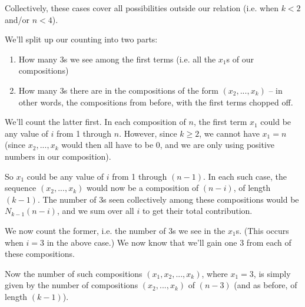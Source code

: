 Collectively, these cases cover all possibilities outside our relation (i.e. when $k < 2$ and/or $n < 4$). 


We'll split up our counting into two parts:
\begin{enumerate}
\item How many 3s we see among the first terms (i.e. all the $x_1$s of our compositions)
\item How many 3s there are in the compositions of the form $(x_2, ..., x_k)$ -- in other words, the compositions from before, with the first terms chopped off.
\end{enumerate}






We'll count the latter first. In each composition of $n$, the first term $x_1$ could be any value of $i$ from 1 through $n$. However, since $k \geq 2$, we cannot have $x_1 = n$ (since $x_2, ..., x_k$ would then all have to be 0, and we are only using positive numbers in our composition). 

So $x_1$ could be any value of $i$ from 1 through $(n-1)$. In each such case, the sequence $(x_2, ..., x_k)$ would now be a composition of $(n-i)$, of length $(k-1)$. The number of 3s seen collectively among these compositions would be $N_{k-1}(n-i)$, and we sum over all $i$ to get their total contribution.

We now count the former, i.e. the number of 3s we see in the $x_1$s. (This occurs when $i = 3$ in the above case.) We now know that we'll gain one 3 from each of these compositions. 

Now the number of such compositions $(x_1, x_2, ..., x_k)$, where $x_1 = 3$, is simply given by the number of compositions $(x_2, ..., x_k)$ of $(n-3)$ (and as before, of length $(k-1)$). 

